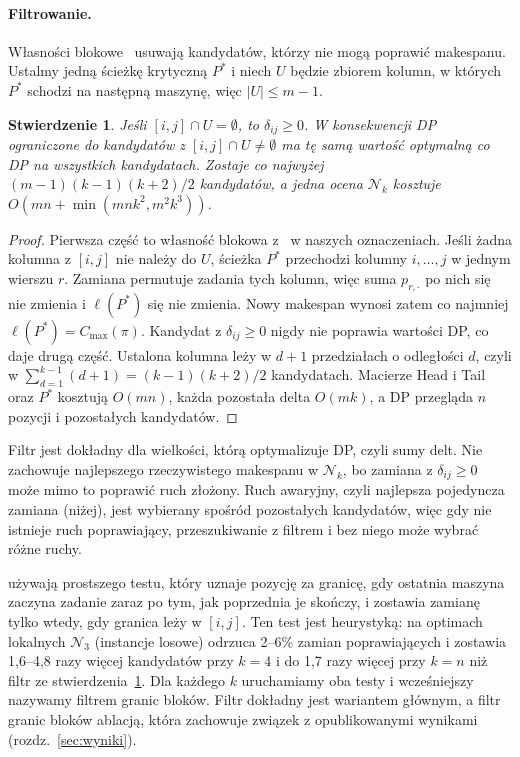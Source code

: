 \documentclass[letterpaper]{article} %
\newtheorem{proposition}{Stwierdzenie}
\theoremstyle{definition}
\newcommand{\N}{\mathcal{N}}
\begin{document}
\paragraph{Filtrowanie.} Własności blokowe~\cite{nowicki1996,grabowski2004}
usuwają kandydatów, którzy nie mogą poprawić makespanu. Ustalmy jedną
ścieżkę krytyczną $P^\ast$ i niech $U$ będzie zbiorem kolumn, w których
$P^\ast$ schodzi na następną maszynę, więc $|U|\leq m-1$.

\begin{proposition}\label{prop:filtr}
Jeśli $[i,j]\cap U=\emptyset$, to $\delta_{ij}\geq 0$. W konsekwencji DP
ograniczone do kandydatów z $[i,j]\cap U\neq\emptyset$ ma tę samą wartość
optymalną co DP na wszystkich kandydatach.
Zostaje co najwyżej $(m-1)(k-1)(k+2)/2$ kandydatów, a jedna ocena $\N_k$
kosztuje $O(mn+\min(mnk^2,m^2k^3))$.
\end{proposition}
\begin{proof}
Pierwsza część to własność blokowa
z~\cite{nowicki1996,grabowski2004} w naszych oznaczeniach. Jeśli żadna
kolumna z $[i,j]$ nie należy do $U$, ścieżka $P^\ast$
przechodzi kolumny $i,\dots,j$ w jednym wierszu $r$. Zamiana permutuje
zadania tych kolumn, więc suma $p_{r,\cdot}$ po nich się nie zmienia
i $\ell(P^\ast)$ się nie zmienia. Nowy makespan wynosi zatem co najmniej
$\ell(P^\ast)=C_{\max}(\pi)$. Kandydat z $\delta_{ij}\geq 0$ nigdy nie
poprawia wartości DP, co daje drugą część. Ustalona kolumna leży w $d+1$
przedziałach o odległości $d$, czyli w
$\sum_{d=1}^{k-1}(d+1)=(k-1)(k+2)/2$ kandydatach. Macierze Head i Tail
oraz $P^\ast$ kosztują $O(mn)$, każda pozostała delta $O(mk)$, a DP
przegląda $n$ pozycji i pozostałych kandydatów.
\end{proof}

Filtr jest dokładny dla wielkości, którą optymalizuje DP, czyli sumy delt.
Nie zachowuje najlepszego rzeczywistego makespanu w $\N_k$, bo zamiana
z $\delta_{ij}\geq 0$ może mimo to poprawić ruch złożony. Ruch awaryjny,
czyli najlepsza pojedyncza zamiana (niżej), jest wybierany spośród
pozostałych kandydatów, więc gdy nie istnieje ruch poprawiający, przeszukiwanie z filtrem i bez
niego może wybrać różne ruchy.

\citet{wojewodzki2026windowed} używają prostszego testu, który
uznaje pozycję za granicę, gdy ostatnia maszyna zaczyna zadanie zaraz po
tym, jak poprzednia je skończy, i zostawia zamianę tylko wtedy, gdy
granica leży w $[i,j]$. Ten test jest heurystyką: na optimach lokalnych $\N_3$ (instancje losowe)
odrzuca 2--6\% zamian poprawiających i zostawia 1,6--4,8 razy więcej
kandydatów przy $k=4$ i do 1,7 razy więcej przy $k=n$ niż filtr ze
stwierdzenia~\ref{prop:filtr}. Dla każdego $k$
uruchamiamy oba testy i wcześniejszy nazywamy filtrem granic bloków.
Filtr dokładny jest wariantem głównym, a filtr granic bloków ablacją,
która zachowuje związek z opublikowanymi wynikami
(rozdz.~\ref{sec:wyniki}).
\end{document}

